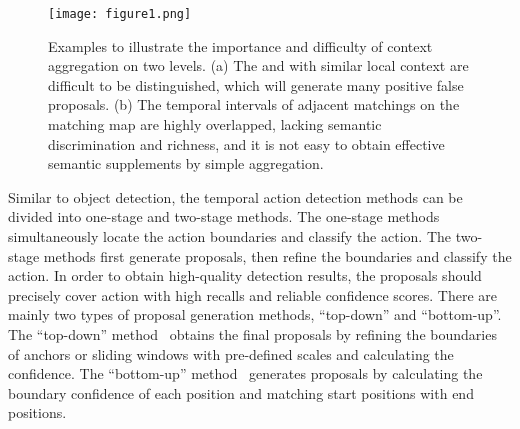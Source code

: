 \documentclass[letterpaper]{article} \usepackage{aaai22}  \usepackage{times}  \usepackage{helvet}  \usepackage{courier}  \usepackage[hyphens]{url}  \usepackage{graphicx} \urlstyle{rm} \def\UrlFont{\rm}  \usepackage{natbib}  \usepackage{caption} \DeclareCaptionStyle{ruled}{labelfont=normalfont,labelsep=colon,strut=off} \frenchspacing  \setlength{\pdfpagewidth}{8.5in}  \setlength{\pdfpageheight}{11in}  \usepackage{algorithm}
\begin{document}
\begin{figure}[!ht]
\centering
\texttt{[image: figure1.png]}
\caption{Examples to illustrate the importance and difficulty of context aggregation on two levels. (a) The  and  with similar local context are difficult to be distinguished, which will generate many positive false proposals. (b) The temporal intervals of adjacent  matchings on the matching map are highly overlapped, lacking semantic discrimination and richness, and it is not easy to obtain effective semantic supplements by simple aggregation.}


\label{fig:intr}
\end{figure}

Similar to object detection, the temporal action detection methods can be divided into one-stage and two-stage methods. The one-stage methods simultaneously locate the action boundaries and classify the action. The two-stage methods first generate proposals, then refine the boundaries and classify the action. In order to obtain high-quality detection results, the proposals should precisely cover action with high recalls and reliable confidence scores. There are mainly two types of proposal generation methods, ``top-down'' and ``bottom-up''. The ``top-down'' method~\cite{turn,gtan,rapnet,talnet,ssad} obtains the final proposals by refining the boundaries of anchors or sliding windows with pre-defined scales and calculating the confidence. 
The ``bottom-up'' method~\cite{tag,bsn,bmn,bcgnn,bsn++,gtad} generates proposals by calculating the boundary confidence of each position and matching start positions with end positions. 
\end{document}
